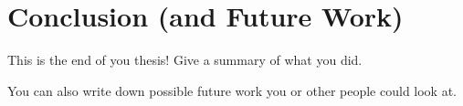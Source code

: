 \chapter{Conclusion (and Future Work)}

This is the end of you thesis! 
Give a summary of what you did.

You can also write down possible future work you or other people could look at.